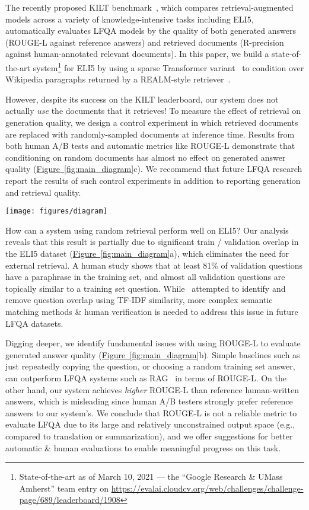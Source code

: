 \documentclass[11pt]{article}
\newcommand{\namedref}[2]{\hyperref[#2]{#1~\ref*{#2}}}
\newcommand{\figureref}[1]{\namedref{Figure}{#1}}
\begin{document}
The recently proposed KILT benchmark~\citep{petroni2020kilt}, which compares retrieval-augmented models across a variety of knowledge-intensive tasks including ELI5, automatically evaluates LFQA models by the quality of both generated answers (ROUGE-L against reference answers) and retrieved documents (R-precision against human-annotated relevant documents). In this paper, we build a state-of-the-art system\footnote{State-of-the-art as of March 10, 2021 --- the ``Google Research \& UMass Amherst'' team entry on \small{\url{https://evalai.cloudcv.org/web/challenges/challenge-page/689/leaderboard/1908}}} for ELI5 by using a sparse Transformer variant~\citep{roy2020efficient} to condition over Wikipedia paragraphs returned by a REALM-style retriever~\citep{guu2020realm}.

However, despite its success on the KILT leaderboard, our system does not actually \emph{use} the documents that it retrieves! To measure the effect of retrieval on generation quality, we design a control experiment in which retrieved documents are replaced with randomly-sampled documents at inference time. Results from both human A/B tests and automatic metrics like ROUGE-L demonstrate that conditioning on random documents has almost no effect on generated answer quality (\figureref{fig:main_diagram}c). We recommend that future LFQA research report the results of such control experiments in addition to reporting generation and retrieval quality.

\begin{figure*}[t]
\texttt{[image: figures/diagram]}
\caption{A summary of the major hurdles (a-d) to progress in long-form question answering with ELI5.}
\label{fig:main_diagram}
\end{figure*}

How can a system using random retrieval perform well on ELI5? Our analysis reveals that this result is partially due to significant train / validation overlap in the ELI5 dataset (\figureref{fig:main_diagram}a), which eliminates the need for external retrieval. A human study shows that at least 81\% of validation questions have a paraphrase in the training set, and almost all validation questions are topically similar to a training set question. While~\citet{fan-etal-2019-eli5} attempted to identify and remove question overlap using TF-IDF similarity, more complex semantic matching methods \& human verification is needed to address this issue in future LFQA datasets.

Digging deeper, we identify fundamental issues with using ROUGE-L to evaluate generated answer quality (\figureref{fig:main_diagram}b). Simple baselines such as just repeatedly copying the question, or choosing a random training set answer, can outperform  LFQA systems such as RAG~\citep{lewis2020retrieval} in terms of ROUGE-L. On the other hand, our system achieves \emph{higher} ROUGE-L than reference human-written answers, which is misleading since human A/B testers strongly prefer reference answers to our system's. We conclude that ROUGE-L is not a reliable metric to evaluate LFQA due to its large and relatively unconstrained output space (e.g., compared to translation or summarization), and we offer suggestions for better automatic \& human evaluations to enable meaningful progress on this task.
\end{document}
